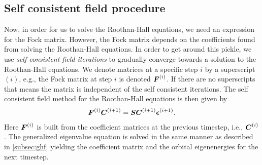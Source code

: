         \subsection{Self consistent field procedure}
            Now, in order for us to solve the Roothan-Hall equations, we need an
            expression for the Fock matrix.
            However, the Fock matrix depends on the coefficients found from
            solving the Roothan-Hall equations.
            In order to get around this pickle, we use \emph{self consistent
            field iterations} to gradually converge towards a solution to the
            Roothan-Hall equations.
            We denote matrices at a specific step $i$ by a superscript $(i)$,
            e.g., the Fock matrix at step $i$ is denoted $\boldsymbol{F}^{(i)}$.
            If there are no superscripts that means the matrix is independent of
            the self consistent iterations.
            The self consistent field method for the Roothan-Hall equations is
            then given by
            \begin{align}
                \boldsymbol{F}^{(i)}\boldsymbol{C}^{(i + 1)}
                = \boldsymbol{S} \boldsymbol{C}^{(i + 1)}\boldsymbol{\epsilon}^{(i + 1)}.
                \label{eq:ghf-scf-roothan-hall}
            \end{align}
            Here $\boldsymbol{F}^{(i)}$ is built from the coefficient matrices at the
            previous timestep, i.e., $\boldsymbol{C}^{(i)}$.
            The generalized eigenvalue equation is solved in the same manner as
            described in \autoref{subsec:ghf} yielding the coefficient matrix
            and the orbital eigenenergies for the next timestep.

